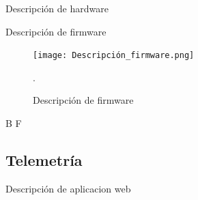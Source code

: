 \documentclass[journal]{IEEEtran}
\begin{document}
Descripción de hardware

Descripción de firmware 


\begin{figure}[!h]
	\centering
	\texttt{[image: Descripción\_firmware.png]}
	\caption{Descripción de firmware}.
	\label{estructura_general}
\end{figure}



{\color{blue}B F}


\subsection{Telemetría}
Descripción de aplicacion web
\newline






\end{document}
